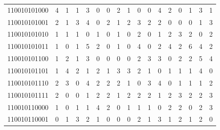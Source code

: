 \documentclass[10pt,a4paper]{article}
\begin{document}
\begin{longtable}{ |c|c|c|c|c|c|c|c|c|c|c|c|c|c|c|c|c| }
    110010101000              & 4                            & 1                                & 1                            & 3                              & 0   & 0   & 2   & 1   & 0   & 0   & 4   & 2   & 0   & 1   & 3   & 1   \\
    110010101001              & 2                            & 1                                & 3                            & 4                              & 0   & 2   & 1   & 2   & 3   & 2   & 2   & 0   & 0   & 0   & 1   & 3   \\
    110010101010              & 1                            & 1                                & 1                            & 0                              & 1   & 0   & 1   & 0   & 2   & 0   & 1   & 2   & 3   & 2   & 0   & 2   \\
    110010101011              & 1                            & 0                                & 1                            & 5                              & 2   & 0   & 1   & 0   & 4   & 0   & 2   & 4   & 2   & 6   & 4   & 2   \\
    110010101100              & 1                            & 2                                & 1                            & 3                              & 0   & 0   & 0   & 0   & 2   & 3   & 3   & 0   & 2   & 2   & 5   & 4   \\
    110010101101              & 1                            & 4                                & 2                            & 1                              & 2   & 1   & 3   & 3   & 2   & 1   & 0   & 1   & 1   & 1   & 4   & 0   \\
    110010101110              & 2                            & 3                                & 0                            & 4                              & 2   & 2   & 2   & 1   & 0   & 3   & 4   & 0   & 1   & 1   & 1   & 2   \\
    110010101111              & 2                            & 0                                & 0                            & 1                              & 2   & 2   & 1   & 2   & 2   & 2   & 1   & 2   & 3   & 2   & 2   & 3   \\
    110010110000              & 1                            & 0                                & 1                            & 1                              & 4   & 2   & 0   & 1   & 1   & 1   & 0   & 2   & 2   & 0   & 2   & 3   \\
    110010110001              & 0                            & 1                                & 3                            & 2                              & 1   & 0   & 0   & 0   & 2   & 1   & 3   & 1   & 2   & 1   & 2   & 0   \\

\end{longtable}
\end{document}

